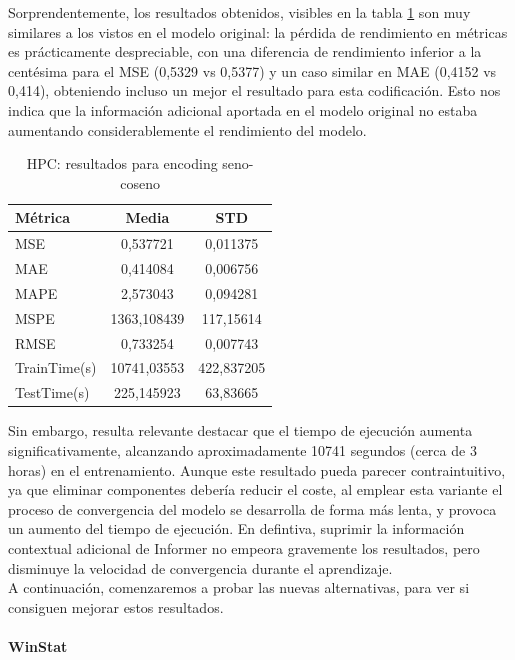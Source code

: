 Sorprendentemente, los resultados obtenidos, visibles en la tabla \ref{hpcfixed} son muy similares a los vistos en el modelo original: la pérdida de rendimiento en métricas es prácticamente despreciable, con una diferencia de rendimiento inferior a la centésima para el MSE (0,5329 vs 0,5377) y un caso similar en MAE (0,4152 vs 0,414), obteniendo incluso un mejor el resultado para esta codificación. Esto nos indica que la información adicional aportada en el modelo original no estaba aumentando considerablemente el rendimiento del modelo.\\

\begin{table}[!ht]
	\centering
	\begin{tabular}{l|c|c}
		\toprule
		Métrica & Media & STD \\
		\midrule
		MSE & 0,537721 & 0,011375 \\
		MAE & 0,414084 & 0,006756 \\
		MAPE & 2,573043 & 0,094281 \\
		MSPE & 1363,108439 & 117,15614 \\
		RMSE & 0,733254 & 0,007743 \\
		TrainTime(s) & 10741,03553 & 422,837205 \\
		TestTime(s) & 225,145923 & 63,83665 \\
		\bottomrule
	\end{tabular}
	\caption{HPC: resultados para encoding seno-coseno}
	\label{hpcfixed}
\end{table}


Sin embargo, resulta relevante destacar que el tiempo de ejecución aumenta significativamente, alcanzando aproximadamente 10741 segundos (cerca de 3 horas) en el entrenamiento. Aunque este resultado pueda parecer contraintuitivo, ya que eliminar componentes debería reducir el coste, al emplear esta variante el proceso de convergencia del modelo se desarrolla de forma más lenta, y provoca un aumento del tiempo de ejecución. En defintiva, suprimir la información contextual adicional de Informer no empeora gravemente los resultados, pero disminuye la velocidad de convergencia durante el aprendizaje.\\

A continuación, comenzaremos a probar las nuevas alternativas, para ver si consiguen mejorar estos resultados.

\paragraph{WinStat}

